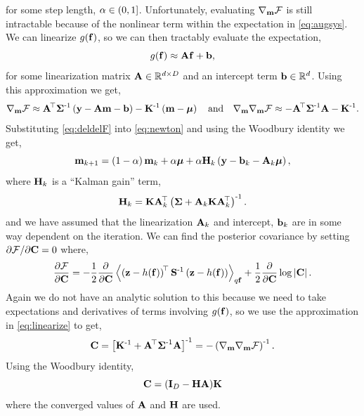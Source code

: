 \documentclass{article} %
\begin{document}
for some step length, $\step \in (0, 1]$. Unfortunately, evaluating
$\nabla_\pomean\Fengy$ is still intractable because of the nonlinear term
within the expectation in \eqref{eq:augsys}. We can linearize
$\nonlin{\lstate}$, so we can then tractably evaluate the expectation,
\begin{equation}
    \nonlin{\lstate} \approx \Linmat\lstate + \intcpt,
    \label{eq:linearize}
\end{equation}
for some linearization matrix $\Linmat \in \real{d \times D}$ and an intercept
term $\intcpt \in \real{d}$. Using this approximation we get,
\begin{equation}
    \nabla_\pomean \Fengy
        \approx \Linmat\transpose\lcov\inv\brac{\obs - \Linmat\pomean 
            - \intcpt} - \prcov\inv\brac{\pomean - \prmean}
    \quad \text{and} \quad
    \nabla_\pomean \nabla_\pomean \Fengy
        \approx - \Linmat\transpose\lcov\inv\Linmat - \prcov\inv.
        \label{eq:deldelF}
\end{equation}
Substituting \eqref{eq:deldelF} into \eqref{eq:newton} and using the Woodbury
identity we get,
\begin{equation}
    \pomean_{k+1} = \brac{1-\step}\pomean_k + \step\prmean 
        + \step\Kgain_k\brac{\obs - \intcpt_k - \Linmat_k\prmean},
    \label{eq:pomean}
\end{equation}
where $\Kgain_k$ is a ``Kalman gain'' term,
\begin{equation}
    \Kgain_k = \prcov\Linmat_k\transpose\brac{\lcov +
        \Linmat_k\prcov\Linmat_k\transpose}\inv.
    \label{eq:kgain}
\end{equation}
and we have assumed that the linearization $\Linmat_k$ and intercept,
$\intcpt_k$ are in some way dependent on the iteration. We can find the 
posterior covariance by setting $\partial\Fengy/\partial\pocov = 0$ where,
\begin{equation}
    \frac{\partial\Fengy}{\partial\pocov} = -\frac{1}{2} 
        \frac{\partial}{\partial\pocov}
        \expec{q\lstate}{
            \brac{\augobs - \augnonlin{\lstate}}\transpose\augcov\inv
            \brac{\augobs - \augnonlin{\lstate}}
    } 
    + \frac{1}{2} \frac{\partial}{\partial\pocov} \log \deter{\pocov}.
\end{equation}
Again we do not have an analytic solution to this because we need to take
expectations and derivatives of terms involving $\nonlin{\lstate}$, so we use
the approximation in \eqref{eq:linearize} to get,
\begin{equation}
    \pocov = \sbrac{\prcov\inv + \Linmat\transpose\lcov\inv\Linmat}\inv
        = - \brac{\nabla_\pomean \nabla_\pomean \Fengy}\inv.
    \label{eq:pocovi}
\end{equation}
Using the Woodbury identity,
\begin{equation}
    \pocov = \brac{\ident{D} - \Kgain\Linmat}\!\prcov
    \label{eq:pocov}
\end{equation}
where the converged values of $\Linmat$ and $\Kgain$ are used.
\end{document}
